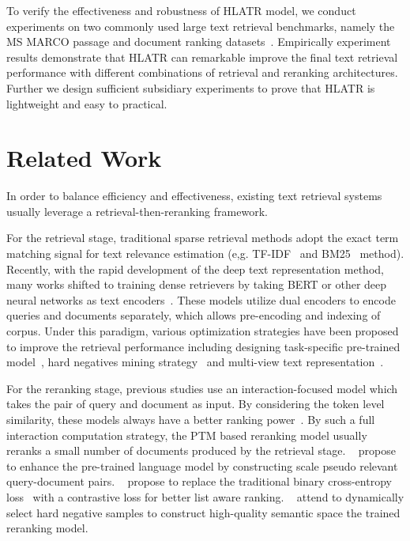 \documentclass[11pt]{article}
\begin{document}
To verify the effectiveness and robustness of HLATR model, we conduct experiments on two commonly used large text retrieval benchmarks, namely the MS MARCO passage and document ranking datasets~\cite{Campos2016MSMA}. Empirically experiment results demonstrate that HLATR can remarkable improve the final text retrieval performance with different combinations of retrieval and reranking architectures. Further we design sufficient subsidiary experiments to prove that HLATR is lightweight and easy to practical.

\section{Related Work}
In order to balance efficiency and effectiveness, existing text retrieval systems usually leverage a retrieval-then-reranking framework. 

For the retrieval stage, traditional sparse retrieval methods adopt the exact term matching signal for text relevance estimation (e,g. TF-IDF~\cite{luhn1957statistical} and BM25~\cite{robertson2009probabilistic} method). Recently, with the rapid development of the deep text representation method, many works shifted to training dense retrievers by taking BERT or other deep neural networks as text encoders~\cite{karpukhin2020dense,nogueira2019passage}. These models utilize dual encoders to encode queries and documents separately, which allows pre-encoding and indexing of corpus. Under this paradigm, various optimization strategies have been proposed to improve the retrieval performance including designing task-specific pre-trained model~\cite{gao2021unsupervised,gao2021condenser}, hard negatives mining strategy~\cite{xiong2021approximate} and multi-view text representation~\cite{hu2021multi}.

For the reranking stage, previous studies use an interaction-focused model which takes the pair of query and document as input. By considering the token level similarity, these models always have a better ranking power~\cite{guo2016deep}. By such a full interaction computation strategy, the PTM based reranking model usually reranks a small number of documents produced by the retrieval stage. ~\cite{ma2021b} propose to enhance the pre-trained language model by constructing scale pseudo relevant query-document pairs.  ~\cite{gao2021rethink} propose to replace the traditional binary cross-entropy loss~\cite{nogueira2019passage} with a contrastive loss for better list aware ranking. ~\cite{pu2021yes} attend to dynamically select hard negative samples to construct high-quality semantic space the trained reranking model.
\end{document}
